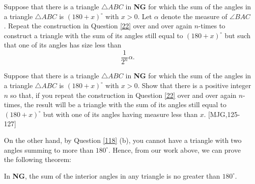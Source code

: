 \documentclass{ximera}
\begin{document}
\begin{question}
\label{21} Suppose that there is a triangle $\triangle ABC$ in
\textbf{NG} for which the sum of the angles in a triangle $\triangle ABC$ is
$\left( 180+x\right)^\circ$ with $x>0$. Let $\alpha$ denote the
measure of $\angle BAC$. Repeat the construction in Question \ref{22}
over and over again $n$-times to construct a triangle with the sum of
its angles still equal to $\left( 180+x\right)^\circ$ but such that
one of its angles has size less than%
\[
\frac{1}{2^{n}}\alpha.
\]
\end{question}

\begin{question}
\label{121} Suppose that there is a triangle $\triangle ABC$ in
\textbf{NG} for which the sum of the angles in a triangle $\triangle ABC$ is
$\left( 180+x\right)^\circ$ with $x>0$. Show that there is a positive
integer $n$ so that, if you repeat the construction in
Question \ref{22} over and over again $n$-times, the result will be a
triangle with the sum of its angles still equal to $\left(
180+x\right)^\circ$ but with one of its angles having measure less
than $x$. [MJG,125-127]
\end{question}


On the other hand, by Question \ref{118} (b), you cannot have a
triangle with two angles summing to more than $180^\circ$. Hence, from
our work above, we can prove the following theorem:

\begin{theorem}
In \textbf{NG}, the sum of the interior angles in any triangle is no greater
than $180^\circ$.
\end{theorem}
\end{document}
